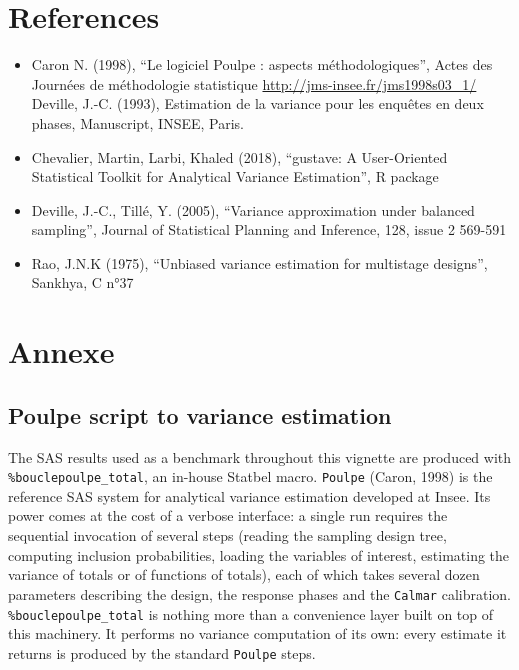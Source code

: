 \documentclass[
]{article}
\begin{document}
\section{References}\label{references}

\begin{itemize}
\item
  Caron N. (1998), ``Le logiciel Poulpe : aspects méthodologiques'',
  Actes des Journées de méthodologie statistique
  \url{http://jms-insee.fr/jms1998s03_1/} Deville, J.-C. (1993),
  Estimation de la variance pour les enquêtes en deux phases,
  Manuscript, INSEE, Paris.
\item
  Chevalier, Martin, Larbi, Khaled (2018), ``gustave: A User-Oriented
  Statistical Toolkit for Analytical Variance Estimation'', R package
\item
  Deville, J.-C., Tillé, Y. (2005), ``Variance approximation under
  balanced sampling'', Journal of Statistical Planning and Inference,
  128, issue 2 569-591
\item
  Rao, J.N.K (1975), ``Unbiased variance estimation for multistage
  designs'', Sankhya, C n°37
\end{itemize}

\section{Annexe}\label{annexe}

\subsection{Poulpe script to variance
estimation}\label{poulpe-script-to-variance-estimation}

The SAS results used as a benchmark throughout this vignette are
produced with \texttt{\%bouclepoulpe\_total}, an in-house Statbel macro.
\texttt{Poulpe} (Caron, 1998) is the reference SAS system for analytical
variance estimation developed at Insee. Its power comes at the cost of a
verbose interface: a single run requires the sequential invocation of
several steps (reading the sampling design tree, computing inclusion
probabilities, loading the variables of interest, estimating the
variance of totals or of functions of totals), each of which takes
several dozen parameters describing the design, the response phases and
the \texttt{Calmar} calibration. \texttt{\%bouclepoulpe\_total} is
nothing more than a convenience layer built on top of this machinery. It
performs no variance computation of its own: every estimate it returns
is produced by the standard \texttt{Poulpe} steps.
\end{document}
